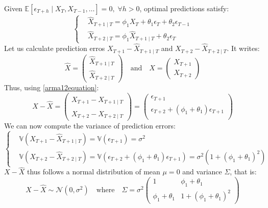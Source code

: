 \documentclass[]{article}
\begin{document}
Given $\mathbb{E}[\epsilon_{T+h}\mid X_T, X_{T-1},\dots] = 0,\; \forall h>0$, optimal predictions satisfy:
\begin{equation}
	\left\{
	\begin{array}{ll}
		&\hat{X}_{T+1\mid T} = \phi_1 X_{T} + \theta_1 \epsilon_{T}+ \theta_2 \epsilon_{T-1}\\
		&\hat{X}_{T+2\mid T} = \phi_1 \hat{X}_{T+1\mid T} + \theta_2 \epsilon_{T}
	\end{array}\right.
\end{equation}
Let us calculate prediction erros $X_{T+1} - \hat{X}_{T+1\mid T}$ and $X_{T+2} - \hat{X}_{T+2\mid T}$. It writes:
\begin{equation}
	\hat{X} = 
	\begin{pmatrix}
		\hat{X}_{T+1\mid T}\\
		\hat{X}_{T+2\mid T}
	\end{pmatrix}\quad
	\text{and}\quad
	X = \begin{pmatrix}
		X_{T+1}\\
		X_{T+2}
	\end{pmatrix}
\end{equation}
Thus, using \eqref{arma12equation}:
\begin{equation}
	X - \hat{X} = 
	\begin{pmatrix}
		X_{T+1} - \hat{X}_{T+1\mid T}\\
		X_{T+2} - \hat{X}_{T+2\mid T}
	\end{pmatrix}
	=
	\begin{pmatrix}
	\epsilon_{T+1}\\
	\epsilon_{T+2} + (\phi_1 + \theta_1)\epsilon_{T+1}\\
	\end{pmatrix}
\end{equation}
We can now compute the variance of prediction errors:
\begin{equation}
	\left\{
	\begin{array}{ll}
		&\mathbb{V}(X_{T+1} - \hat{X}_{T+1\mid T}) = \mathbb{V}(\epsilon_{T+1}) = \sigma^2\\
		&\mathbb{V}(X_{T+2} - \hat{X}_{T+2\mid T}) = \mathbb{V}(\epsilon_{T+2} + (\phi_1 + \theta_1)\epsilon_{T+1}) = \sigma^2(1+(\phi_1 + \theta_1)^2)
	\end{array}
	\right.
\end{equation}
$X-\hat{X}$ thus follows a normal distribution of mean $\mu = 0$ and variance $\Sigma$, that is:
\begin{equation}
	X-\hat{X} \sim \mathcal{N}(0, \sigma^2) \quad \text{where}\quad
	\Sigma = \sigma^2
	\begin{pmatrix}
	1 & \phi_1 + \theta_1\\
	\phi_1 + \theta_1 & 1 + (\phi_1 + \theta_1)^2
	\end{pmatrix}
\end{equation}
\end{document}
